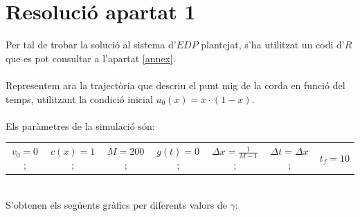 \documentclass[a4paper, 11pt]{article}
\begin{document}
\section{Resolució apartat 1}\label{apartat1}
Per tal de trobar la solució al sistema d'$EDP$ plantejat, s'ha utilitzat un codi d'$R$ que es pot consultar a l'apartat \textcolor{blue}{\ref{annex}}.\\\\
Representem ara la trajectòria que descriu el punt mig de la corda en funció del temps, utilitzant la condició inicial $u_{0}(x) = x \cdot (1-x)$.\\\\
Els paràmetres de la simulació són:
\begin{table}[h]
    \centering
    \begin{tabular}{ccccccc}
        $v_{0} = 0$; & $c(x) = 1$; & $M = 200$; & $g(t) = 0$; & $\Delta x = \frac{1}{M-1}$; & $\Delta t = \Delta x$; & $t_f = 10$\\
    \end{tabular}
\end{table}
\\
S'obtenen els següents gràfics per diferents valors de $\gamma$:
\vspace{-1.8em}
\begin{figure}[h]
\captionsetup[subfigure]{labelformat=empty}
\centering
\end{figure}\\
\end{document}
